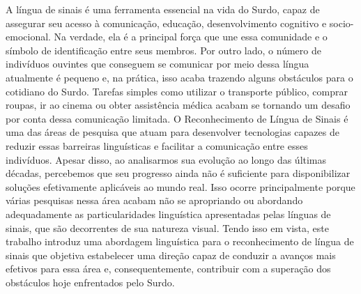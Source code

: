 \begin{resumo}[Resumo]
  \noindent
  A língua de sinais é uma ferramenta essencial na vida do Surdo, capaz de assegurar seu acesso à comunicação, educação, desenvolvimento cognitivo e socio-emocional.
  Na verdade, ela é a principal força que une essa comunidade e o símbolo de identificação entre seus membros.
  Por outro lado, o número de indivíduos ouvintes que conseguem se comunicar por meio dessa língua atualmente é pequeno e, na prática, isso acaba trazendo alguns obstáculos para o cotidiano do Surdo.
  Tarefas simples como utilizar o transporte público, comprar roupas, ir ao cinema ou obter assistência médica acabam se tornando um desafio por conta dessa comunicação limitada.
  O Reconhecimento de Língua de Sinais é uma das áreas de pesquisa que atuam para desenvolver tecnologias capazes de reduzir essas barreiras linguísticas e facilitar a comunicação entre esses indivíduos.
  Apesar disso, ao analisarmos sua evolução ao longo das últimas décadas, percebemos que seu progresso ainda não é suficiente para disponibilizar soluções efetivamente aplicáveis ao mundo real.
  Isso ocorre principalmente porque várias pesquisas nessa área acabam não se apropriando ou abordando adequadamente as particularidades linguística apresentadas pelas línguas de sinais, que são decorrentes de sua natureza visual.
  Tendo isso em vista, este trabalho introduz uma abordagem linguística para o reconhecimento de língua de sinais que objetiva estabelecer uma direção capaz de conduzir a avanços mais efetivos para essa área e, consequentemente, contribuir com a superação dos obstáculos hoje enfrentados pelo Surdo.





\end{resumo}
